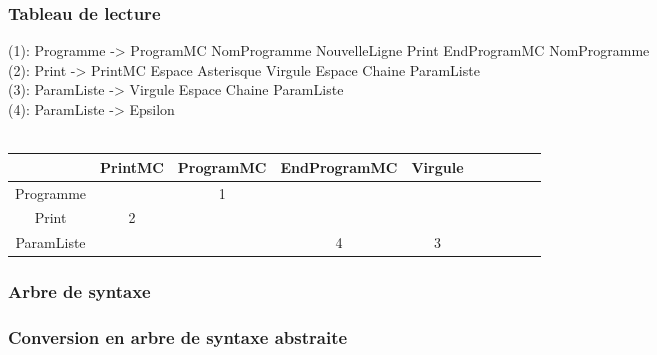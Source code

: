 \begin{frame}
    \frametitle{Tableau de lecture\esp}
    \small
    (1): Programme -> ProgramMC NomProgramme NouvelleLigne Print EndProgramMC NomProgramme\\
    (2): Print -> PrintMC Espace Asterisque Virgule Espace Chaine ParamListe\\
    (3): ParamListe -> Virgule Espace Chaine ParamListe\\
    (4): ParamListe ->  Epsilon \\\\
    \vspace{0.25cm}
    {
    \footnotesize
    \begin{tabular}{|c|c|c|c|c|c|c|c|c|c|}
        \hline
        & PrintMC & ProgramMC & EndProgramMC & Virgule \\
        \hline
        Programme & & 1 & & \\
        \hline
        Print & 2 & & & \\
        \hline
        ParamListe & & & 4 & 3 \\
        \hline
    \end{tabular}
    }

\end{frame}



\begin{frame}
    \frametitle{Arbre de syntaxe\esp}
    \begin{center}
        \scalebox{1.2}{
        
        }
        
    \end{center}
\end{frame}



\begin{frame}
    \frametitle{Conversion en arbre de syntaxe abstraite\esp}
    
\end{frame}


